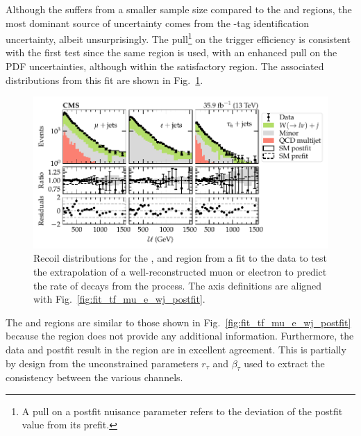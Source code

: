 %
Although the \tauplusjets suffers from a smaller sample size compared to the \muplusjets and \eleplusjets regions, the most dominant source of uncertainty comes from the \Ptauh-tag identification uncertainty, albeit unsurprisingly.  The pull\footnote{A pull on a postfit nuisance parameter refers to the deviation of the postfit value from its prefit.} on the \ptmiss trigger efficiency is consistent with the first test since the same region is used, with an enhanced pull on the PDF uncertainties, although within the satisfactory region. The associated \recoil distributions from this fit are shown in Fig.~\ref{fig:fit_tf_mue_t_wj_postfit}.
%
\begin{figure}[htb]
    \centering
    \includegraphics{chapters/042_backgrounds/images/postfit_tfmue2twj.pdf}
    \caption[Recoil distributions corrected by the transfer factor from the muon and electron control regions to the $\tau$-lepton validation region.]{
        Recoil distributions for the \muplusjets, \eleplusjets and \tauplusjets region from a fit to the data to test the extrapolation of a well-reconstructed muon or electron to predict the rate of \Ptauh decays from the \IWj process. The axis definitions are aligned with Fig.~\ref{fig:fit_tf_mu_e_wj_postfit}.
    }
    \label{fig:fit_tf_mue_t_wj_postfit}
\end{figure}
%
The \muplusjets and \eleplusjets regions are similar to those shown in Fig.~\ref{fig:fit_tf_mu_e_wj_postfit} because the \tauplusjets region does not provide any additional information. Furthermore, the data and postfit result in the \tauplusjets region are in excellent agreement. This is partially by design from the unconstrained parameters $r_\tau$ and $\beta_\tau$ used to extract the consistency between the various channels.

